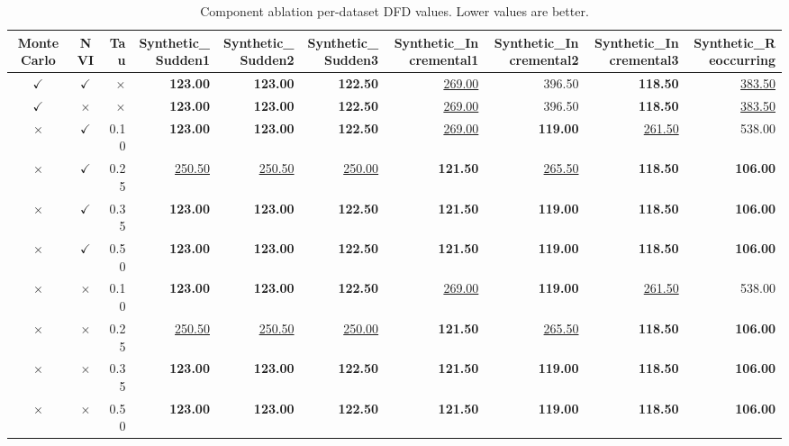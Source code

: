 \begin{table}
\caption{Component ablation per-dataset DFD values. Lower values are better.}
\label{tab:per-data-component-ablation-delay-for-detection}
\begin{tabular}{ccrrrrrrrr}
\toprule
Monte Carlo & NVI & Tau & Synthetic\_Sudden1 & Synthetic\_Sudden2 & Synthetic\_Sudden3 & Synthetic\_Incremental1 & Synthetic\_Incremental2 & Synthetic\_Incremental3 & Synthetic\_Reoccurring \\
\midrule
$\checkmark$ & $\checkmark$ & $\times$ & \textbf{123.00} & \textbf{123.00} & \textbf{122.50} & \underline{269.00} & 396.50 & \textbf{118.50} & \underline{383.50} \\
$\checkmark$ & $\times$ & $\times$ & \textbf{123.00} & \textbf{123.00} & \textbf{122.50} & \underline{269.00} & 396.50 & \textbf{118.50} & \underline{383.50} \\
$\times$ & $\checkmark$ & 0.10 & \textbf{123.00} & \textbf{123.00} & \textbf{122.50} & \underline{269.00} & \textbf{119.00} & \underline{261.50} & 538.00 \\
$\times$ & $\checkmark$ & 0.25 & \underline{250.50} & \underline{250.50} & \underline{250.00} & \textbf{121.50} & \underline{265.50} & \textbf{118.50} & \textbf{106.00} \\
$\times$ & $\checkmark$ & 0.35 & \textbf{123.00} & \textbf{123.00} & \textbf{122.50} & \textbf{121.50} & \textbf{119.00} & \textbf{118.50} & \textbf{106.00} \\
$\times$ & $\checkmark$ & 0.50 & \textbf{123.00} & \textbf{123.00} & \textbf{122.50} & \textbf{121.50} & \textbf{119.00} & \textbf{118.50} & \textbf{106.00} \\
$\times$ & $\times$ & 0.10 & \textbf{123.00} & \textbf{123.00} & \textbf{122.50} & \underline{269.00} & \textbf{119.00} & \underline{261.50} & 538.00 \\
$\times$ & $\times$ & 0.25 & \underline{250.50} & \underline{250.50} & \underline{250.00} & \textbf{121.50} & \underline{265.50} & \textbf{118.50} & \textbf{106.00} \\
$\times$ & $\times$ & 0.35 & \textbf{123.00} & \textbf{123.00} & \textbf{122.50} & \textbf{121.50} & \textbf{119.00} & \textbf{118.50} & \textbf{106.00} \\
$\times$ & $\times$ & 0.50 & \textbf{123.00} & \textbf{123.00} & \textbf{122.50} & \textbf{121.50} & \textbf{119.00} & \textbf{118.50} & \textbf{106.00} \\
\bottomrule
\end{tabular}
\end{table}
